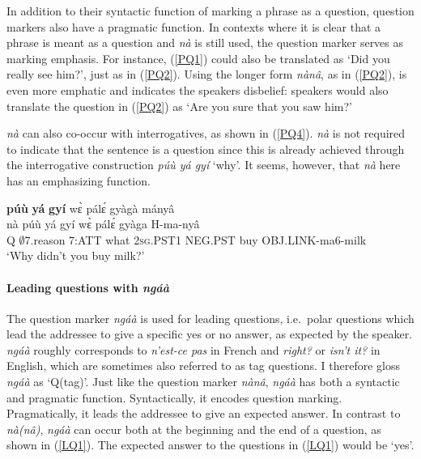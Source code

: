 In addition to their syntactic function of marking a phrase as a question, question markers also have a pragmatic function. In contexts where it is clear that a phrase is meant as a question and {\itshape nà} is still used, the question marker serves as marking emphasis. For instance, (\ref{PQ1}) could also be translated as `Did you really see him?', just as in (\ref{PQ2}). Using the longer form {\itshape nànâ}, as in (\ref{PQ2}), is even more emphatic and indicates the speakers disbelief: speakers would also translate the question in (\ref{PQ2}) as `Are you sure that you saw him?'

 {\itshape nà} can also co-occur with interrogatives, as shown in (\ref{PQ4}). {\itshape nà} is not required to indicate that the sentence is a question since this is already achieved through the interrogative construction {\itshape púù yá gyí} `why'. It seems, however, that {\itshape nà} here has an emphasizing function.%

\begin{exe}
\ex\label{PQ4}
   {\bfseries púù} {\bfseries yá} {\bfseries gyí} wɛ̀ pálɛ́ gyàgà mányâ \\
         nà púù yá gyí wɛ̀ pálɛ́ gyàga H-ma-nyâ \\
               Q $\emptyset$7.reason 7:ATT what 2\textsc{sg}.PST1 NEG.PST buy OBJ.LINK-ma6-milk \\
    \trans `Why didn't you buy milk?'
\end {exe}




\paragraph{Leading questions with {\itshape ngáà}}

\noindent The question marker {\itshape ngáà} is used for leading questions, i.e.\ polar questions which lead the addressee to give a specific yes or no answer, as expected by the speaker. {\itshape ngáà} roughly corresponds to {\itshape n'est-ce pas} in French and {\itshape right?} or {\itshape isn't it?} in English, which are sometimes also referred to as tag questions. I therefore gloss {\itshape ngáà} as `Q(tag)'. Just like the question marker {\itshape nànâ}, {\itshape ngáà} has both a syntactic and pragmatic function. Syntactically, it encodes question marking. Pragmatically, it leads the addressee to give an expected answer. In contrast to {\itshape nà(nâ)}, {\itshape ngáà} can occur both at the beginning and the end of a question, as shown in (\ref{LQ1}). The expected answer to the questions in (\ref{LQ1}) would be `yes'.

